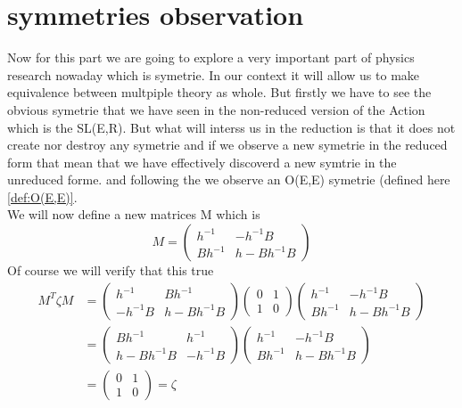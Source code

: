 \documentclass{article}
\begin{document}
\section{symmetries observation}
Now for this part we are going to explore a very important part of physics research nowaday which is symetrie. In our context it will allow us to make equivalence between multpiple theory as whole. 
But firstly we have to see the obvious symetrie that we have seen in the non-reduced version of the Action which is the SL(E,R).
But what will interss us in the reduction is that it does not create nor destroy any symetrie and if we observe a new symetrie in the reduced form that mean that we have effectively discoverd a new symtrie in the unreduced forme.
and following the \cite{maharana1993noncompact} we observe an O(E,E) symetrie (defined here \ref{def:O(E,E)}.\\
We will now define a new matrices M which is 
\begin{equation}
    M = \begin{pmatrix}
        h^{-1} & -h^{-1}B \\Bh^{-1} & h-Bh^{-1}B
    \end{pmatrix}
\end{equation}
Of course we will verify that this true
\begin{equation*}
    \begin{aligned}
        M^{T}\zeta M &= \begin{pmatrix} h^{-1} & B h^{-1} \\ - h^{-1} B & h-Bh^{-1}B\end{pmatrix} \begin{pmatrix}0 & 1 \\ 1 & 0\end{pmatrix}\begin{pmatrix}    h^{-1} & -h^{-1}B \\Bh^{-1} & h-Bh^{-1}B\end{pmatrix}\\
        & =\begin{pmatrix}B h^{-1}   &h^{-1}  \\h-Bh^{-1}B   &- h^{-1} B \end{pmatrix} \begin{pmatrix}    h^{-1} & -h^{-1}B \\Bh^{-1} & h-Bh^{-1}B\end{pmatrix}\\
        &= \begin{pmatrix}0 & 1 \\ 1 & 0\end{pmatrix} = \zeta
    \end{aligned}
\end{equation*}
\end{document}
